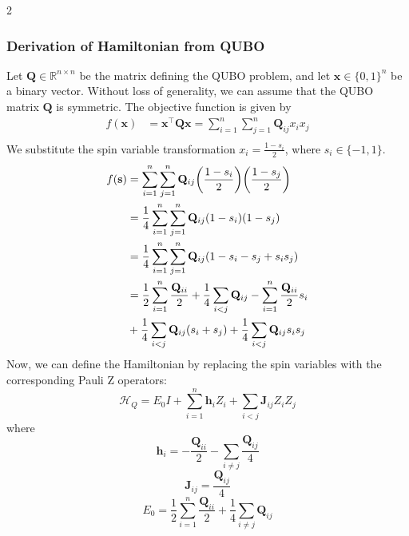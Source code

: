 \documentclass[10pt]{article}
\begin{document}
\begin{multicols*}{2}
\subsubsection*{Derivation of Hamiltonian from QUBO}
\label{subsec:qubo_to_hamiltonian}
Let $\mathbf{Q} \in \mathbb{R}^{n \times n}$ be the matrix defining the QUBO problem, and let $\mathbf{x} \in \{0, 1\}^n$ 
be a binary vector. Without loss of generality, we can assume that the QUBO matrix $\mathbf{Q}$ is symmetric.
The objective function is given by
$$
\begin{aligned}
f(\mathbf{x}) &= \mathbf{x}^\top \mathbf{Q} \mathbf{x} = \sum_{i=1}^n \sum_{j=1}^n \mathbf{Q}_{ij} x_i x_j \\
\end{aligned}
$$
We substitute the spin variable transformation $x_i = \frac{1 - s_i}{2}$, where $s_i \in \{-1, 1\}$.
$$
\begin{aligned}
f(\mathbf{s}) &= \sum_{i=1}^n \sum_{j=1}^n \mathbf{Q}_{ij} \pqty{\frac{1 - s_i}{2}} \pqty{\frac{1 - s_j}{2}}\\
&= \frac{1}{4} \sum_{i=1}^n \sum_{j=1}^n \mathbf{Q}_{ij} (1 - s_i)(1 - s_j) \\
&= \frac{1}{4} \sum_{i=1}^n \sum_{j=1}^n \mathbf{Q}_{ij} (1 - s_i - s_j + s_i s_j) \\
&= \frac{1}{2} \sum_{i=1}^n \frac{\mathbf{Q}_{ii}}{2} + \frac{1}{4} \sum_{i<j} \mathbf{Q}_{ij} - \sum_{i=1}^n \frac{\mathbf{Q}_{ii}}{2} s_i\\
&+\frac{1}{4} \sum_{i<j} \mathbf{Q}_{ij} (s_i + s_j) + \frac{1}{4} \sum_{i<j} \mathbf{Q}_{ij} s_i s_j \\
\end{aligned}
$$
Now, we can define the Hamiltonian by replacing the spin variables with the corresponding 
Pauli Z operators:
$$\mathcal{H}_{Q} = E_0 I + \sum_{i=1}^n \mathbf{h}_i Z_i + \sum_{i<j} \mathbf{J}_{ij} Z_i Z_j$$
where $$\mathbf{h}_i = -\frac{\mathbf{Q}_{ii}}{2} - \sum_{i \neq j} \frac{\mathbf{Q}_{ij}}{4}$$
$$\mathbf{J}_{ij} = \frac{\mathbf{Q}_{ij}}{4}$$
$$E_0 = \frac{1}{2} \sum_{i=1}^n \frac{\mathbf{Q}_{ii}}{2} + \frac{1}{4} \sum_{i\neq j} \mathbf{Q}_{ij}$$
 

\end{multicols*}
\clearpage
\end{document}
